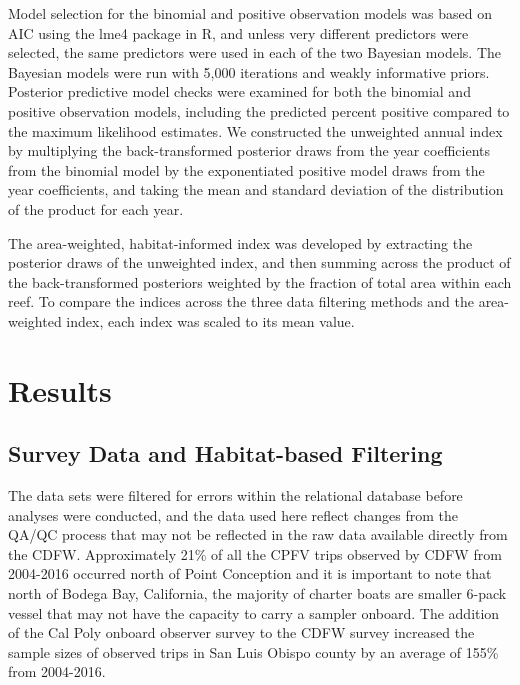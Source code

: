 \documentclass[
  12pt,
  authoryear,
  preprint,
  3p]{elsarticle}
\begin{document}
Model selection for the binomial and positive observation models was
based on AIC using the lme4 package in R, and unless very different
predictors were selected, the same predictors were used in each of the
two Bayesian models. The Bayesian models were run with 5,000 iterations
and weakly informative priors. Posterior predictive model checks were
examined for both the binomial and positive observation models,
including the predicted percent positive compared to the maximum
likelihood estimates. We constructed the unweighted annual index by
multiplying the back-transformed posterior draws from the year
coefficients from the binomial model by the exponentiated positive model
draws from the year coefficients, and taking the mean and standard
deviation of the distribution of the product for each year.

The area-weighted, habitat-informed index was developed by extracting
the posterior draws of the unweighted index, and then summing across the
product of the back-transformed posteriors weighted by the fraction of
total area within each reef. To compare the indices across the three
data filtering methods and the area-weighted index, each index was
scaled to its mean value.

\hypertarget{results}{%
\section{Results}\label{results}}

\hypertarget{survey-data-and-habitat-based-filtering-1}{%
\subsection{Survey Data and Habitat-based
Filtering}\label{survey-data-and-habitat-based-filtering-1}}

The data sets were filtered for errors within the relational database
before analyses were conducted, and the data used here reflect changes
from the QA/QC process that may not be reflected in the raw data
available directly from the CDFW. Approximately 21\% of all the CPFV
trips observed by CDFW from 2004-2016 occurred north of Point Conception
and it is important to note that north of Bodega Bay, California, the
majority of charter boats are smaller 6-pack vessel that may not have
the capacity to carry a sampler onboard. The addition of the Cal Poly
onboard observer survey to the CDFW survey increased the sample sizes of
observed trips in San Luis Obispo county by an average of 155\% from
2004-2016.
\end{document}
